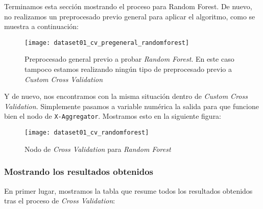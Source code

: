 \documentclass[11pt]{article}
\begin{document}
Terminamos esta sección mostrando el proceso para Random Forest. De nuevo, no realizamos un preprocesado previo general para aplicar el algoritmo, como se muestra a continuación:

\begin{figure}[H]
    \centering
    \texttt{[image: dataset01\_cv\_pregeneral\_randomforest]}
    \caption{Preprocesado general previo a probar \emph{Random Forest}. En este caso tampoco estamos realizando ningún tipo de preprocesado previo a \emph{Custom Cross Validation}}
\end{figure}

Y de nuevo, nos encontramos con la misma situación dentro de \emph{Custom Cross Validation}. Simplemente pasamos a variable numérica la salida para que funcione bien el nodo de \lstinline{X-Aggregator}. Mostramos esto en la siguiente figura:

\begin{figure}[H]
    \centering
    \texttt{[image: dataset01\_cv\_randomforest]}
    \caption{Nodo de \emph{Cross Validation} para \emph{Random Forest}}
\end{figure}

\pagebreak

\subsubsection{Mostrando los resultados obtenidos}

En primer lugar, mostramos la tabla que resume todos los resultados obtenidos tras el proceso de \emph{Cross Validation}:

\begin{table}[H]
\begin{center}
\end{center}
    \caption{Resultados de \emph{Cross Validation}, para los distintos algoritmos estudiados, en el primer \emph{dataset}}
\end{table}
\end{document}
